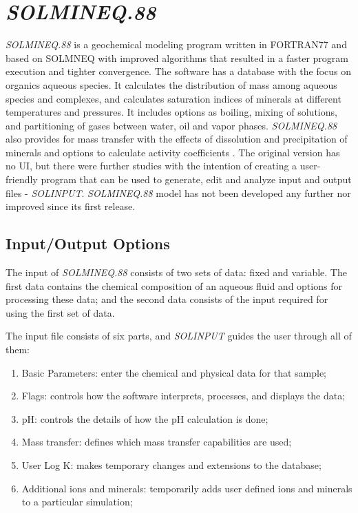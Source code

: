 \section{\emph{SOLMINEQ.88}}
\emph{SOLMINEQ.88}  is a geochemical modeling program written in FORTRAN77 and based on SOLMNEQ \cite{Kharaka:73} with improved algorithms that resulted in a faster program execution and tighter convergence. The software has a database with the focus on organics aqueous species. It calculates the distribution of mass among aqueous species and complexes, and calculates saturation indices of minerals at different temperatures and pressures. It includes options as boiling, mixing of solutions, and partitioning of gases between water, oil and vapor phases. \emph{SOLMINEQ.88} also provides for mass transfer with the effects of dissolution and precipitation of minerals and options to calculate activity coefficients \cite{Kharaka:88}. The original version has no UI, but there were further studies with the intention of creating a user-friendly program that can be used to generate, edit and analyze input and output files - \emph{SOLINPUT}.
\emph{SOLMINEQ.88} model has not been developed any further nor improved since its first release.

\subsection{Input/Output Options}
The input of \emph{SOLMINEQ.88} consists of two sets of data: fixed and variable. The first data contains the chemical composition of an aqueous fluid and options for processing these data; and the second data consists of the input required for using the first set of data.

The input file consists of six parts, and \emph{SOLINPUT} guides the user through all of them:
\begin{enumerate}
\item Basic Parameters: enter the chemical and physical data for that sample;
\item Flags: controls how the software interprets, processes, and displays the data;
\item pH: controls the details of how the pH calculation is done;
\item Mass transfer: defines which mass transfer capabilities are used;
\item User Log K: makes temporary changes and extensions to the database;
\item Additional ions and minerals: temporarily adds user defined ions and minerals to a particular simulation;
\end{enumerate}


